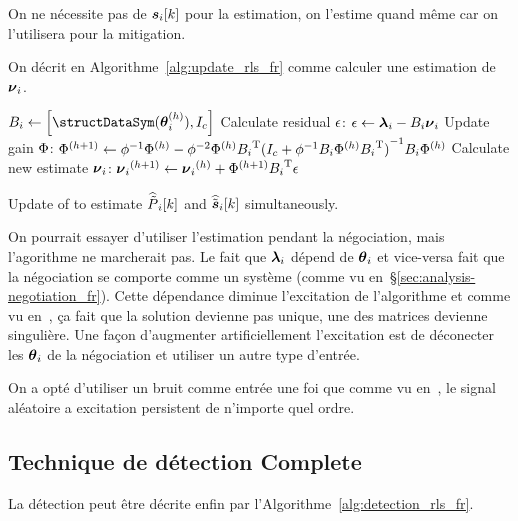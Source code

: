 \documentclass[../main.tex]{subfiles}
\begin{document}
\begin{remark}
  On ne nécessite pas de $\boldsymbol{s}_{i}[k]$ pour la estimation, on l'estime quand même car on l'utilisera pour la mitigation.
\end{remark}

On décrit en Algorithme~\ref{alg:update_rls_fr} comme calculer une estimation de ${\boldsymbol{\nu}_{i}}$.

\begin{algorithm2e}[h]
  \DontPrintSemicolon%
  $\rlssysinput\gets\left[\text{\structDataSym}(\thetai\h),I_{c}\right]$\;
  Calculate residual ${\epsilon}$: ${\epsilon}\gets {\boldsymbol{\lambda}_{i}}-{B_i}{\boldsymbol{\nu}_{i}}$\;
  Update gain ${\Phi}$: ${\Phi}^{(h+1)}\gets {\phi}^{-1}{\Phi}^{(h)}-{\phi}^{-2}{\Phi}^{(h)}{B_i}^{\mathrm{T}}{(I_{c}+{\phi}^{-1}{B_i}{\Phi}^{(h)}{B_i}^{\mathrm{T}})}^{-1}{B_i}{\Phi}^{(h)}$\;
  Calculate new estimate ${\boldsymbol{\nu}_{i}}$: ${\boldsymbol{\nu}_{i}}^{(h+1)}\gets{\boldsymbol{\nu}_{i}}^{(h)}+{\Phi}^{(h+1)}{B_i}^{\mathrm{T}}{\epsilon}$\;
  \caption{Update of \RLS{} to estimate $\widehat{\tilde{P}}_{i}[k]$ and $\widehat{\tilde{\boldsymbol{s}}}_{i}[k]$ simultaneously.}\label{alg:update_rls_fr}
\end{algorithm2e}

On pourrait essayer d'utiliser l'estimation pendant la négociation, mais l'agorithme ne marcherait pas.
Le fait que $\boldsymbol{\lambda}_{i}$ dépend de $\boldsymbol{\theta}_{i}$ et vice-versa fait que la négociation se comporte comme un système \dt{} (comme vu en~\S\ref{sec:analysis-negotiation_fr}).
Cette dépendance diminue l'excitation de l'algorithme et comme vu en~\cite{AstroemWittenmark1989}, ça fait que la solution devienne pas unique, une des matrices devienne singulière.
Une façon d'augmenter artificiellement l'excitation est de déconecter les $\boldsymbol{\theta}_{i}$ de la négociation et utiliser un autre type d'entrée.

On a opté d'utiliser un bruit comme entrée une foi que comme vu en~\cite[\S3.4]{AstroemWittenmark1989}, le signal aléatoire a excitation persistent de n'importe quel ordre.

\subsection{Technique de détection Complete }\label{sec:compl-detect-algor_fr}
La détection peut être décrite enfin par l'Algorithme~\ref{alg:detection_rls_fr}.
\end{document}
